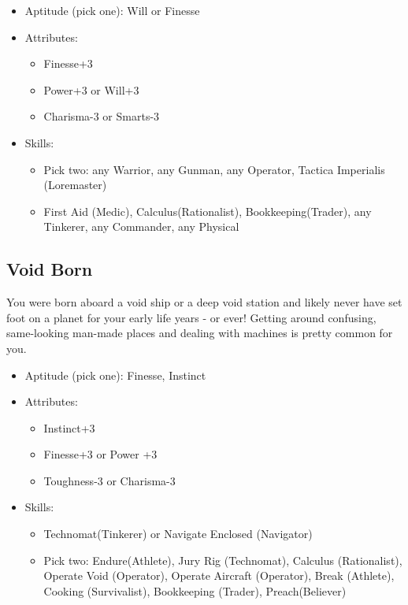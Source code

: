 \begin{itemize}
	\item Aptitude (pick one): Will or Finesse
	\item Attributes:
	\begin{itemize}
		\item Finesse+3
		\item Power+3 or Will+3
		\item Charisma-3 or Smarts-3
	\end{itemize}
	\item Skills: 
	\begin{itemize}
	 	\item Pick two: any Warrior, any Gunman, any Operator, Tactica Imperialis (Loremaster)
	 	\item First Aid (Medic), Calculus(Rationalist), Bookkeeping(Trader), any Tinkerer, any Commander, any Physical
	 \end{itemize} 
\end{itemize}

\subsection{Void Born}
You were born aboard a void ship or a deep void station and likely never have set foot on a planet for your early life years - or ever! Getting around confusing, same-looking man-made places and dealing with machines is pretty common for you.
\begin{itemize}
	\item Aptitude (pick one): Finesse, Instinct
	\item Attributes:
	\begin{itemize}
		\item Instinct+3
		\item Finesse+3 or Power +3
		\item Toughness-3 or Charisma-3
	\end{itemize}
	\item Skills: 
	\begin{itemize}
	 	\item Technomat(Tinkerer) or Navigate Enclosed (Navigator)
	 	\item Pick two: Endure(Athlete), Jury Rig (Technomat), Calculus (Rationalist), Operate Void (Operator), Operate Aircraft (Operator), Break (Athlete), Cooking (Survivalist), Bookkeeping (Trader), Preach(Believer)
	 \end{itemize} 
\end{itemize}

